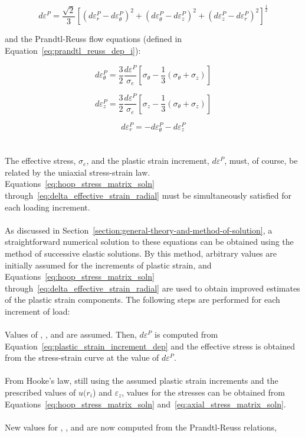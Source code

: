 \begin{equation}
    \label{eq:plastic_strain_increment_dep}
    d \varepsilon^P=\frac{\sqrt{2}}{3} \left[ (d \varepsilon_{r}^{P}-d \varepsilon_{\theta}^{P})^2+(d \varepsilon_{\theta}^{P}-d \varepsilon_{z}^{P})^2+(d \varepsilon_{z}^{P}-d \varepsilon_{r}^{P})^2 \right] ^{\frac{1}{2}}
\end{equation}

and the Prandtl-Reuss flow equations (defined in Equation~\ref{eq:prandtl_reuss_dep_i}):

\begin{equation}
    \label{eq:delta_effective_strain_hoop}
    d \varepsilon_{\theta}^{P}= \frac{3}{2} \frac{d \varepsilon^P}{\sigma_e} \left[ \sigma_{\theta} - \frac{1}{3}(\sigma_{\theta}+\sigma_{z} )\right]
\end{equation}

\begin{equation}
    \label{eq:delta_effective_strain_axial}
    d \varepsilon_{z}^{P}= \frac{3}{2} \frac{d \varepsilon^P}{\sigma_e} \left[ \sigma_{z} - \frac{1}{3}(\sigma_{\theta}+\sigma_{z} )\right]
\end{equation}

\begin{equation}
    \label{eq:delta_effective_strain_radial}
    d \varepsilon_{r}^{P}= -d \varepsilon_{\theta}^{P}-d \varepsilon_{z}^{P}
\end{equation}
\\
\\
The effective stress, $\sigma_{e}$, and the plastic strain increment, $d\varepsilon^{P}$, must, of
course, be related by the uniaxial stress-strain law. Equations~\ref{eq:hoop_stress_matrix_soln}
through~\ref{eq:delta_effective_strain_radial} must be simultaneously satisfied for each loading
increment.
\\
\\
As discussed in Section~\ref{section:general-theory-and-method-of-solution}, a straightforward
numerical solution to these equations can be obtained using the method of successive elastic
solutions. By this method, arbitrary values are initially assumed for the increments of plastic
strain, and Equations~\ref{eq:hoop_stress_matrix_soln}
through~\ref{eq:delta_effective_strain_radial} are used to obtain improved estimates of the plastic
strain components.  The following steps are performed for each increment of load:
\\
\\
Values of \detheta, \dez , \der and are assumed. Then, $d\varepsilon^{P}$ is computed from
Equation~\ref{eq:plastic_strain_increment_dep} and the effective stress is obtained from the
stress-strain curve at the value of $d\varepsilon^{P}$.
\\
\\
From Hooke's law, still using the assumed plastic strain increments and the prescribed values of
$u(r_{i}$) and $\varepsilon_{z}$, values for the stresses can be obtained from
Equations~\ref{eq:hoop_stress_matrix_soln} and~\ref{eq:axial_stress_matrix_soln}.
\\
\\
New values for \detheta, \dez, \der and are now computed from the Prandtl-Reuss relations,

